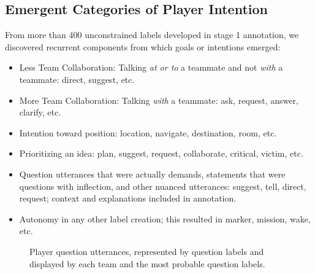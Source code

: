 \documentclass[10pt]{article}
\begin{document}
\subsection{Emergent Categories of Player Intention}
From more than 400 unconstrained labels developed in stage 1 annotation, we discovered recurrent components from which goals or intentions emerged:

\begin{itemize}
    \item Less Team Collaboration: Talking \emph{at or to} a teammate and not \emph{with} a teammate: direct, suggest, etc.
    \item More Team Collaboration: Talking \emph{with} a teammate: ask, request, answer, clarify, etc.
    \item Intention toward position: location, navigate, destination, room, etc.
    \item Prioritizing an idea: plan, suggest, request, collaborate, critical, victim, etc.
    \item Question utterances that were actually demands, statements that were questions with inflection, and other nuanced utterances: suggest, tell, direct, request; context and explanations included in annotation.
    \item Autonomy in any other label creation; this resulted in marker, mission, wake, etc.
\end{itemize}


\clearpage

\begin{figure}[h!]
    \centering
    \caption{Player question utterances, represented by question labels and displayed by each team and the most probable question labels.}
\end{figure}
\end{document}
